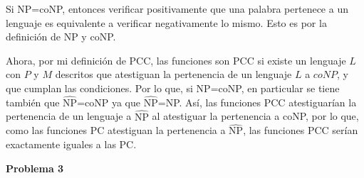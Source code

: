 \documentclass[letterpaper,10pt]{article}
\begin{document}
\begin{itemize}
    Si NP=coNP, entonces verificar positivamente que una palabra pertenece a un lenguaje es equivalente a verificar negativamente lo mismo. Esto es por la definición de NP y coNP.

    Ahora, por mi definición de PCC, las funciones son PCC si existe un lenguaje $L$ con $P$ y $M$ descritos que atestiguan la pertenencia de un lenguaje $L$ a $coNP$, y que cumplan las condiciones. Por lo que, si NP=coNP, en particular se tiene también que $\hat{\text{NP}}$=coNP ya que $\hat{\text{NP}}$=NP. Así, las funciones PCC atestiguarían la pertenencia de un lenguaje a $\hat{\text{NP}}$ al atestiguar la pertenencia a coNP, por lo que, como las funciones PC atestiguan la pertenencia a $\hat{\text{NP}}$, las funciones PCC serían exactamente iguales a las PC.

\end{itemize}


\textbf{Problema 3}
\end{document}
